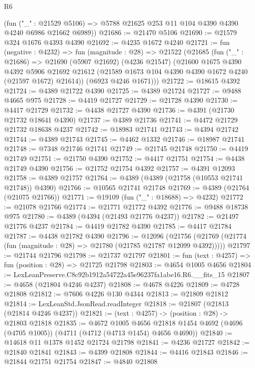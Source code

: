 \begin{lexlean}{R6}
\begin{coremodule}
      (fun ("_" : @21529 @5106) => @5788 @21625 @253 @11 @104 @4390 @4390 @4240 @6986 @21662 @6989))
@21686 := @21470 @5106
@21690 := @21579 @324 @1676 @4393 @4390
@21692 := @4235 @1672 @4240
@21721 := fun (negative : @4232) =>
  fun (magnitude : @28) =>
  @21522
    (@21685
      (fun ("_" : @21686) =>
      @21690
        (@5907 @21692)
        (@4236 @21547)
        (@21600
          @1675
          @4390
          @4392
          @5906
          @21692
          @21612
          (@21589 @1673 @104 @4390 @4390 @1672 @4240 (@21597 @1672) @21614))
        (@6923 @4246 @1671)))
@21722 := @18615 @4392
@21724 := @4389 @21722 @4390
@21725 := @4389 @21724
@21727 := @9488 @4665 @975
@21728 := @4419 @21727
@21729 := @21728 @4390
@21730 := @4417 @21729
@21732 := @4438 @21727 @4390
@21736 := @4391 (@21730 @21732 @18641 @4390)
@21737 := @4389 @21736
@21741 := @4472 @21729 @21732 @18638 @4237
@21742 := @18983 @21741
@21743 := @4394 @21742
@21744 := @4389 @21743
@21745 := @4462 @1332
@21746 := @18987 @21741
@21748 := @7348 @21746 @21741
@21749 := @21745 @21748
@21750 := @4419 @21749
@21751 := @21750 @4390
@21752 := @4417 @21751
@21754 := @4438 @21749 @4390
@21756 := @21752 @21754 @4392
@21757 := @4391 @12093
@21758 := @4389 @21757
@21764 := @4389 (@4389 (@21758 (@10553 @21741 @21748)) @4390)
@21766 := @10565 @21741 @21748
@21769 := @4389 (@21764 (@21075 @21766))
@21771 := @19109 (fun ("_" : @18688) => @4232)
@21772 := @21078 @21766
@21774 := @21771 @21772 @4392
@21776 := @9488 @18738 @975
@21780 := @4389 (@4394 (@21493 @21776 @4237))
@21782 := @21497 @21776 @4237
@21784 := @4419 @21782 @4390
@21785 := @4417 @21784
@21787 := @4438 @21782 @4390
@21796 := @12096
    (@21756 (@21769 (@21774 (fun (magnitude : @28) => @21780 (@21785 @21787 @12099 @4392)))))
@21797 := @21744 @21796
@21798 := @21737 @21797
@21801 := fun (text : @4257) => fun (position : @28) => @21725 @21798
@21803 := @4654 @1005 @4656
@21804 := LexLeanPreserve.C8c92b1912a54722a45e96237fa1abe16.R6.__fits_15
@21807 := @4658 (@21804 @4246 @4237)
@21808 := @4678 @4226
@21809 := @4728 @21808
@21812 := @7606 @4226 @130 @4344
@21813 := @21809 @21812
@21814 := LexLeanStd.JsonRead.readInteger
@21818 := @21807 (@21813 (@21814 @4246 @4237))
@21821 := (text : @4257) -> (position : @28) -> @21803 @21818
@21835 := @4672
    @1005
    @4656
    @21818
    @1454
    @4692
    (@4696 (@4705 @1005))
    (@4711 (@4712 (@4713 @1454) @4656 @4690))
@21840 := @14618 @11 @1378 @1452 @21724 @21798
@21841 := @4236 @21727
@21842 := @21840 @21841
@21843 := @4399 @21808
@21844 := @4416 @21843
@21846 := @21844 @21751 @21754
@21847 := @4840 @21808

\end{coremodule}
\end{lexlean}
